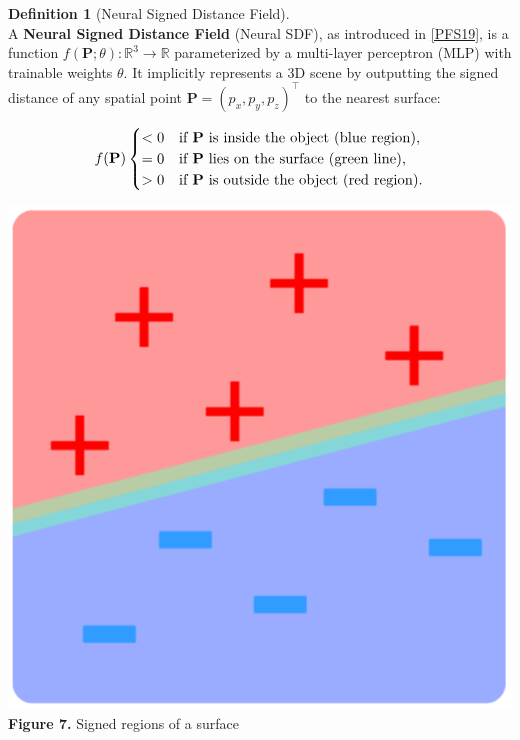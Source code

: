 \documentclass[12pt,a4paper]{article}
\theoremstyle{definition}
\newtheorem{definition}{Definition}[subsection]
\begin{document}
\begin{definition}[Neural Signed Distance Field] \label{def:neural_sdf} ~\\
A \textbf{Neural Signed Distance Field} (Neural SDF), as introduced in \hyperlink{[PFS19]}{[PFS19]}, is a function $f(\mathbf{P}; \theta): \mathbb{R}^3 \to \mathbb{R}$ parameterized by a multi-layer perceptron (MLP) with trainable weights $\theta$. It implicitly represents a 3D scene by outputting the signed distance of any spatial point $\mathbf{P} = (p_x, p_y, p_z)^\top$ to the nearest surface:

\begin{minipage}{0.5\textwidth}
\[
\scalebox{1.05}{$
f(\mathbf{P})
\begin{cases}
< 0 & \text{if } \mathbf{P} \text{ is inside the object (blue region)}, \\
= 0 & \text{if } \mathbf{P} \text{ lies on the surface (green line)}, \\
> 0 & \text{if } \mathbf{P} \text{ is outside the object (red region)}.
\end{cases}
$}
\]
\end{minipage}
\hspace{-1em}
\begin{minipage}{0.5\textwidth}
    \begin{center}
    \includegraphics[height=0.17\textheight]{sdf_region.png} \\
    \textbf{Figure 7.} Signed regions of a surface \\
    \end{center}
\end{minipage}

\end{definition}
\end{document}
